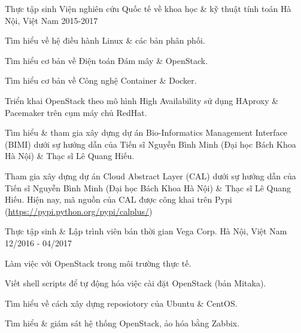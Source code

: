

\begin{cventries}

  \cventry
    {Thực tập sinh} %
    {Viện nghiên cứu Quốc tế về khoa học \& kỹ thuật tính toán} %
    {Hà Nội, Việt Nam} %
    {2015-2017} %
    {
      \begin{cvitems} %
        \item {Tìm hiểu về hệ điều hành Linux \& các bản phân phối.}
        \item {Tìm hiểu cơ bản về Điện toán Đám mây \& OpenStack.}
        \item {Tìm hiểu cơ bản về Công nghệ Container \& Docker.}
        \item {Triển khai OpenStack theo mô hình High Availability sử dụng HAproxy \& Pacemaker trên cụm máy chủ RedHat.}
        \item {Tìm hiểu \& tham gia xây dựng dự án Bio-Informatics Management Interface (BIMI) dưới sự hướng dẫn của Tiến sĩ Nguyễn Bình Minh (Đại học Bách Khoa Hà Nội) \& Thạc sĩ Lê Quang Hiếu.}
        \item {Tham gia xây dựng dự án Cloud Abstract Layer (CAL) dưới sự hướng dẫn của Tiến sĩ Nguyễn Bình Minh (Đại học Bách Khoa Hà Nội) \& Thạc sĩ Lê Quang Hiếu. Hiện nay, mã nguồn của CAL được công khai trên Pypi (\url{https://pypi.python.org/pypi/calplus/})}
      \end{cvitems}
    }

  \cventry
    {Thực tập sinh \& Lập trình viên bán thời gian} %
    {Vega Corp.} %
    {Hà Nội, Việt Nam} %
    {12/2016 - 04/2017} %
    {
      \begin{cvitems} %
        \item {Làm việc với OpenStack trong môi trường thực tế.}
        \item {Viết shell scripts để tự động hóa việc cài đặt OpenStack (bản Mitaka).}
        \item {Tìm hiểu về cách xây dựng reposiotory của Ubuntu \& CentOS.}
        \item {Tìm hiểu \& giám sát hệ thống OpenStack, ảo hóa bằng Zabbix.}
      \end{cvitems}
    }


\end{cventries}
